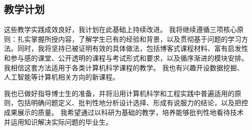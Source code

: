 \subsection*{教学计划}
这些教学实践成效良好，我计划在此基础上持续改进。
我将继续遵循三项核心原则：扎实掌握所授内容，了解学生已有的经验和背景，以及贯彻基于问题的学习方法。同时，我将坚持已被证明有效的具体做法，包括博客式课程材料、富有启发性和参与感的课堂、公开透明的课程与考试形式和要求，以及循序渐进的模块安排。
我相信这套方法适用于各类计算机科学课程的教学。
我也有兴趣开设数据挖掘、人工智能等计算机相关方向的新课程。

\vspace{\entryskip}
我也已做好指导博士生的准备，并将沿用计算机科学和工程实践中普遍适用的原则，包括明确问题定义、批判性地分析设计选择、形成有说服力的结论，以及把控成果展示的质量。
我希望通过以科研为基础的教学，培养能够批判性地看待技术并运用知识解决实际问题的毕业生。

